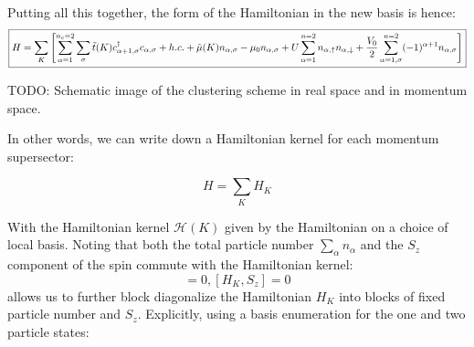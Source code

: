 \documentclass[12pt]{article}
\numberwithin{equation}{section}
\begin{document}
Putting all this together, the form of the Hamiltonian in the new basis is hence:
\begin{equation}
    \boxed{
    \label{eq:ham_nnV_nnU}
    H=\sum_{K}
    \left[\sum_{\alpha=1}^{n_c=2}\sum_{\sigma}
    \tilde t(K) c^\dagger_{\alpha+1,\sigma}c_{\alpha,\sigma}+h.c.
    +\tilde\mu(K) n_{\alpha,\sigma}-\mu_0n_{\alpha,\sigma}
    +U\sum_{\alpha=1}^{n=2}n_{\alpha,\uparrow}n_{\alpha,\downarrow}
    +\frac{V_0}{2}\sum_{\alpha=1,\sigma}^{n=2}(-1)^{\alpha+1}n_{\alpha,\sigma}
    \right]
    }
\end{equation}

TODO: Schematic image of the clustering scheme in real space and in momentum space.

In other words, we can write down a Hamiltonian kernel for each momentum supersector:

\begin{equation}
    H=\sum_{K}H_K
\end{equation}

With the Hamiltonian kernel $\mathcal{H}(K)$ given by the Hamiltonian on a choice of local basis. Noting that both the total particle number $\sum_{\alpha}n_{\alpha}$ and the $S_z$ component of the spin commute with the Hamiltonian kernel:
\begin{equation}
    [H_K,\sum_{\alpha}n_\alpha]=0,[H_K,S_z]=0
\end{equation}
allows us to further block diagonalize the Hamiltonian $H_K$ into blocks of fixed particle number and $S_z$. Explicitly, using a basis enumeration for the one and two particle states:
\end{document}
